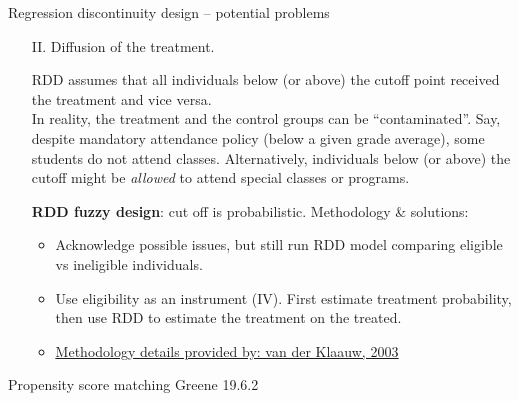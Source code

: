 \documentclass{beamer}
\begin{document}
\begin{frame}{Regression discontinuity design -- potential problems}
\begin{itemize}
    \item[II.] Diffusion of the treatment.\\ \bigskip \small
    
    RDD assumes that all individuals below (or above) the cutoff point received the treatment and vice versa.\\ \smallskip
    In reality, the treatment and the control groups can be ``contaminated''. Say, despite mandatory attendance policy (below a given grade average), some students do not attend classes. Alternatively, individuals below (or above) the cutoff might be \textit{allowed} to attend special classes or programs. \\ \medskip

    \textbf{RDD fuzzy design}: cut off is probabilistic. Methodology \& solutions:\\

    \begin{itemize}
        \item Acknowledge possible issues, but still run RDD model comparing eligible vs ineligible individuals.
        \item Use eligibility as an instrument (IV). First estimate treatment probability, then use RDD to estimate the treatment on the treated.
        \item \textcolor{blue}{\underline{\href{https://onlinelibrary.wiley.com/doi/10.1111/1468-2354.t01-1-00055}{Methodology details provided by: van der Klaauw, 2003}}}
    \end{itemize}


\end{itemize}
\end{frame}
\begin{frame}{Propensity score matching}
    Greene 19.6.2
\end{frame}
\end{document}
